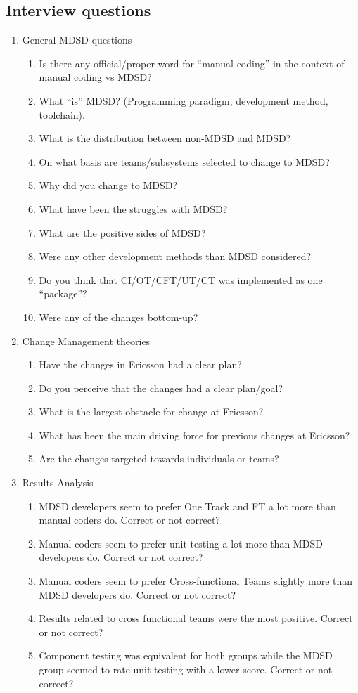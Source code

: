 \documentclass[final_report_innit.tex]{subfiles}
\begin{document}
\clearpage
\subsection{Interview questions}
\begin{enumerate}
	\item General MDSD questions
	\begin{enumerate}
		\item Is there any official/proper word for ``manual coding'' in the context of manual coding vs MDSD?
		\item What ``is'' MDSD? (Programming paradigm, development method, toolchain).
		\item What is the distribution between non-MDSD and MDSD?
		\item On what basis are teams/subsystems selected to change to MDSD?
		\item Why did you change to MDSD?
		\item What have been the struggles with MDSD?
		\item What are the positive sides of MDSD?
		\item Were any other development methods than MDSD considered?
		\item Do you think that CI/OT/CFT/UT/CT was implemented as one ``package''?
		\item Were any of the changes bottom-up?
	\end{enumerate}
	\item Change Management theories
	\begin{enumerate}
		\item Have the changes in Ericsson had a clear plan? 
		\item Do you perceive that the changes had a clear plan/goal?
		\item What is the largest obstacle for change at Ericsson?
		\item What has been the main driving force for previous changes at Ericsson?
		\item Are the changes targeted towards individuals or teams?
	\end{enumerate}
	\item Results Analysis
	\begin{enumerate}
		\item MDSD developers seem to prefer One Track and FT a lot more than manual coders do. Correct or not correct?
		\item Manual coders seem to prefer unit testing a lot more than MDSD developers do. Correct or not correct?
		\item Manual coders seem to prefer Cross-functional Teams slightly more than MDSD developers do. Correct or not correct?
		\item Results related to cross functional teams were the most positive. Correct or not correct?
		\item Component testing was equivalent for both groups while the MDSD group seemed to rate unit testing with a lower score. Correct or not correct?
	\end{enumerate}
\end{enumerate}
\end{document}
